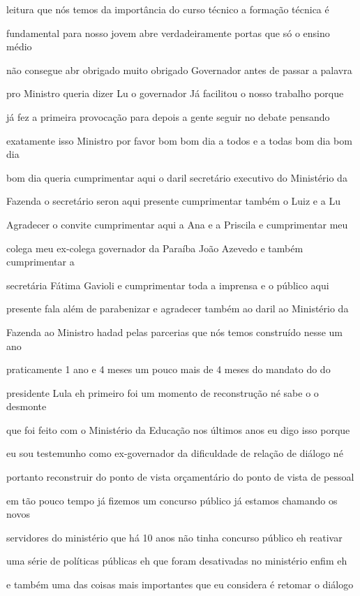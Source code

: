 \documentclass[a4paper,12pt]{article}
\begin{document}
leitura que nós temos da importância do curso técnico a formação técnica é

fundamental para nosso jovem abre verdadeiramente portas que só o ensino médio

não consegue abr obrigado muito obrigado Governador antes de passar a palavra

pro Ministro queria dizer Lu o governador Já facilitou o nosso trabalho porque

já fez a primeira provocação para depois a gente seguir no debate pensando

exatamente isso Ministro por favor bom bom dia a todos e a todas bom dia bom dia

bom dia queria cumprimentar aqui o daril secretário executivo do Ministério da

Fazenda o secretário seron aqui presente cumprimentar também o Luiz e a Lu

Agradecer o convite cumprimentar aqui a Ana e a Priscila e cumprimentar meu

colega meu ex-colega governador da Paraíba João Azevedo e também cumprimentar a

secretária Fátima Gavioli e cumprimentar toda a imprensa e o público aqui

presente fala além de parabenizar e agradecer também ao daril ao Ministério da

Fazenda ao Ministro hadad pelas parcerias que nós temos construído nesse um ano

praticamente 1 ano e 4 meses um pouco mais de 4 meses do mandato do do

presidente Lula eh primeiro foi um momento de reconstrução né sabe o o desmonte

que foi feito com o Ministério da Educação nos últimos anos eu digo isso porque

eu sou testemunho como ex-governador da dificuldade de relação de diálogo né

portanto reconstruir do ponto de vista orçamentário do ponto de vista de pessoal

em tão pouco tempo já fizemos um concurso público já estamos chamando os novos

servidores do ministério que há 10 anos não tinha concurso público eh reativar

uma série de políticas públicas eh que foram desativadas no ministério enfim eh

e também uma das coisas mais importantes que eu considera é retomar o diálogo
\end{document}

